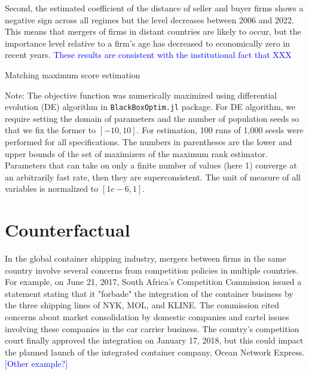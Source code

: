 \documentclass[10pt]{article}
\begin{document}
Second, the estimated coefficient of the distance of seller and buyer firms shows a negative sign across all regimes but the level decreases between 2006 and 2022. 
This means that mergers of firms in distant countries are likely to occur, but the importance level relative to a firm's age has decreased to economically zero in recent years.
\textcolor{blue}{These results are consistent with the institutional fact that XXX}

\begin{table}[!htbp]
  \begin{center}
      \caption{Matching maximum score estimation}
      \label{tb:maximum_score_estimate} 
      
  \end{center}\footnotesize
  Note: The objective function was numerically maximized using differential evolution (DE) algorithm in \texttt{BlackBoxOptim.jl} package. For DE algorithm, we require setting the domain of parameters and the number of population seeds so that we fix the former to $[-10, 10]$. For estimation, 100 runs of 1,000 seeds were performed for all specifications. The numbers in parentheses are the lower and upper bounds of the set of maximizers of the maximum rank estimator. Parameters that can take on only a finite number of values (here 1) converge at an arbitrarily fast rate, then they are superconsistent. The unit of measure of all variables is normalized to $[1e-6,1]$. 
\end{table} 

\section{Counterfactual}\label{sec:counterfactuals}

In the global container shipping industry, mergers between firms in the same country involve several concerns from competition policies in multiple countries.
For example, on June 21, 2017, South Africa's Competition Commission issued a statement stating that it "forbade" the integration of the container business by the three shipping lines of NYK, MOL, and KLINE. 
The commission cited concerns about market consolidation by domestic companies and cartel issues involving these companies in the car carrier business.
The country's competition court finally approved the integration on January 17, 2018, but this could impact the planned launch of the integrated container company, Ocean Network Express. 
\textcolor{blue}{[Other example?]}
\end{document}
